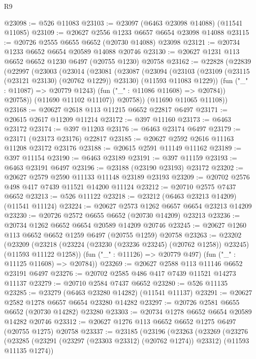 \begin{lexlean}{R9}
\begin{coremodule}
{{{{{{{{{{{{{{{{{{{{{{{{{{{{{{{{{{{{{{{{{{{{{{{{{{{{{{{{{{{{{{{{{{{{{{{{{{{{{{{{{{{{@23098 := @526 @11083
@23103 := @23097 (@6463 @23098 @14088) (@11541 @11085)
@23109 := @20627 @2556 @1233 @6657 @6654 @23098 @14088
@23115 := @20726 @2555 @6655 @6652 (@20730 @14088) @23098
@23121 := @20734 @1233 @6652 @6654 @20589 @14088 @20746
@23130 := @20627 @1231 @113 @6652 @6652 @1230 @6497 (@20755 @1230) @20758
@23162 := @22828
    (@22839
      (@22997
        (@23003
          (@23014
            (@23081
              (@23087
                (@23094
                  (@23103
                    (@23109 (@23115 (@23121 @23130) (@20762 @1229)) @23130)
                    (@11593 @11083 @1229))
                  (fun ("_" : @11087) => @20779 @1243)
                  (fun ("_" : @11086 @11608) => @20784))
                @20758))
            (@11690 @11102 @11107))
          @20758))
      (@11690 @11065 @11108))
@23168 := @20627 @2618 @113 @11215 @6652 @22817 @6497
@23171 := @20615 @2617 @11209 @11214
@23172 := @397 @11160
@23173 := @6463 @23172
@23174 := @397 @11203
@23176 := @6463 @23174 @6497
@23179 := @23171 (@23173 @23176) @22817
@23185 := @20627 @2592 @2616 @11163 @11208 @23172 @23176
@23188 := @20615 @2591 @11149 @11162
@23189 := @397 @11154
@23190 := @6463 @23189
@23191 := @397 @11159
@23193 := @6463 @23191 @6497
@23196 := @23188 (@23190 @23193) @23172
@23202 := @20627 @2579 @2590 @11133 @11148 @23189 @23193
@23209 := @20702 @2576 @498 @417 @7439 @11521 @14200 @11124
@23212 := @20710 @2575 @7437 @6652
@23213 := @526 @11122
@23218 := @23212 (@6463 @23213 @14209) (@11541 @11124)
@23224 := @20627 @2573 @1262 @6657 @6654 @23213 @14209
@23230 := @20726 @2572 @6655 @6652 (@20730 @14209) @23213
@23236 := @20734 @1262 @6652 @6654 @20589 @14209 @20746
@23245 := @20627 @1260 @113 @6652 @6652 @1259 @6497 (@20755 @1259) @20758
@23263 := @23202
    (@23209
      (@23218 (@23224 (@23230 (@23236 @23245) (@20762 @1258)) @23245) (@11593 @11122 @1258))
      (fun ("_" : @11126) => @20779 @497)
      (fun ("_" : @11125 @11608) => @20784))
@23269 := @20627 @2588 @113 @11146 @6652 @23191 @6497
@23276 := @20702 @2585 @486 @417 @7439 @11521 @14273 @11137
@23279 := @20710 @2584 @7437 @6652
@23280 := @526 @11135
@23285 := @23279 (@6463 @23280 @14282) (@11541 @11137)
@23291 := @20627 @2582 @1278 @6657 @6654 @23280 @14282
@23297 := @20726 @2581 @6655 @6652 (@20730 @14282) @23280
@23303 := @20734 @1278 @6652 @6654 @20589 @14282 @20746
@23312 := @20627 @1276 @113 @6652 @6652 @1275 @6497 (@20755 @1275) @20758
@23337 := @23185
    (@23196
      (@23263
        (@23269
          (@23276
            (@23285 (@23291 (@23297 (@23303 @23312) (@20762 @1274)) @23312) (@11593 @11135 @1274))
}}}}}}}}}}}}}}}}}}}}}}}}}}}}}}}}}}}}}}}}}}}}}}}}}}}}}}}}}}}}}}}}}}}}}}}}}}}}}}}}}}}}
\end{coremodule}
\end{lexlean}
